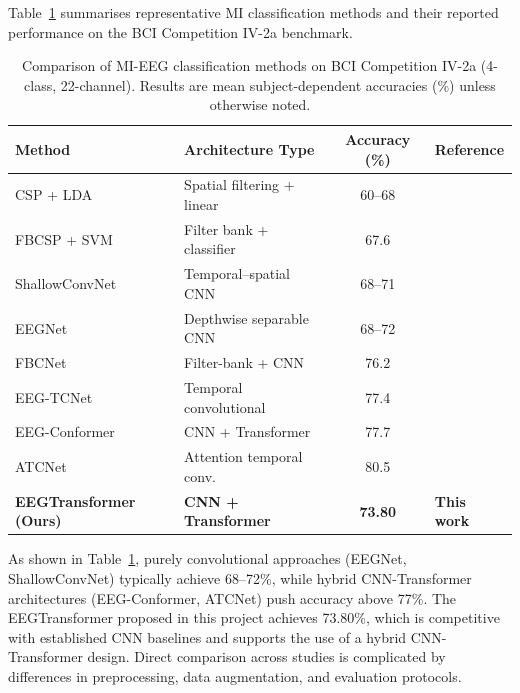 \documentclass[12pt, a4paper]{article}
\begin{document}
Table~\ref{tab:lit_methods} summarises representative MI classification methods and their reported performance on the BCI Competition IV-2a benchmark.

\begin{table}[htbp]
\centering
\caption{Comparison of MI-EEG classification methods on BCI Competition IV-2a (4-class, 22-channel). Results are mean subject-dependent accuracies (\%) unless otherwise noted.}
\label{tab:lit_methods}
\begin{tabular}{@{} l l c l @{}}
\toprule
\textbf{Method} & \textbf{Architecture Type} & \textbf{Accuracy (\%)} & \textbf{Reference} \\
\midrule
CSP + LDA           & Spatial filtering + linear      & 60--68   & \cite{hameed2025enhancing} \\
FBCSP + SVM         & Filter bank + classifier        & 67.6     & \cite{ang2008fbcsp} \\
ShallowConvNet      & Temporal--spatial CNN            & 68--71   & \cite{schirrmeister2017deep} \\
EEGNet              & Depthwise separable CNN          & 68--72   & \cite{lawhern2018eegnet} \\
FBCNet              & Filter-bank + CNN               & 76.2     & \cite{mane2021fbcnet} \\
EEG-TCNet           & Temporal convolutional           & 77.4     & \cite{ingolfsson2020eeg} \\
EEG-Conformer       & CNN + Transformer                & 77.7     & \cite{song2022eeg} \\
ATCNet              & Attention temporal conv.         & 80.5     & \cite{altaheri2022atcnet} \\
\midrule
\textbf{EEGTransformer (Ours)} & \textbf{CNN + Transformer} & \textbf{73.80} & \textbf{This work} \\
\bottomrule
\end{tabular}
\end{table}

As shown in Table~\ref{tab:lit_methods}, purely convolutional approaches (EEGNet, ShallowConvNet) typically achieve 68--72\%, while hybrid CNN-Transformer architectures (EEG-Conformer, ATCNet) push accuracy above 77\%. The EEGTransformer proposed in this project achieves 73.80\%, which is competitive with established CNN baselines and supports the use of a hybrid CNN-Transformer design. Direct comparison across studies is complicated by differences in preprocessing, data augmentation, and evaluation protocols.
\end{document}
